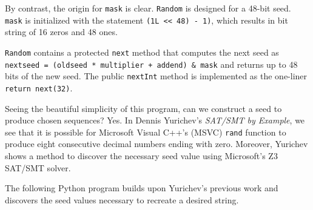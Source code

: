 \documentclass[12pt]{article}
\begin{document}
By contrast, the origin for \texttt{mask} is clear.
\texttt{Random} is designed for a 48-bit seed.
\texttt{mask} is initialized with the statement \texttt{(1L << 48) - 1)}, which results in bit string of 16 zeros and 48 ones.

\texttt{Random} contains a protected \texttt{next} method that computes the next seed as \texttt{nextseed = (oldseed * multiplier + addend) \& mask} and returns up to 48 bits of the new seed.
The public \texttt{nextInt} method is implemented as the one-liner \texttt{return next(32)}.

Seeing the beautiful simplicity of this program, can we construct a seed to produce chosen sequences?
Yes.
In Dennis Yurichev's \textit{SAT/SMT by Example}, we see that it is possible for Microsoft Visual C++'s (MSVC) \texttt{rand} function to produce eight consecutive decimal numbers ending with zero.
Moreover, Yurichev shows a method to discover the necessary seed value using Microsoft's Z3 SAT/SMT solver.

The following Python program builds upon Yurichev's previous work and discovers the seed values necessary to recreate a desired string.
\end{document}
